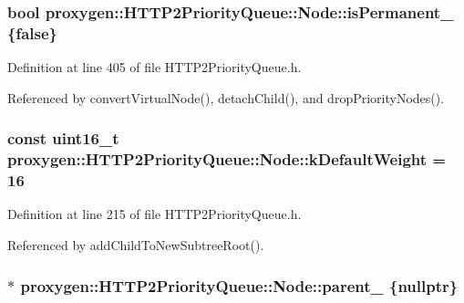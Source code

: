 \subsubsection[{is\+Permanent\+\_\+}]{\setlength{\rightskip}{0pt plus 5cm}bool proxygen\+::\+H\+T\+T\+P2\+Priority\+Queue\+::\+Node\+::is\+Permanent\+\_\+ \{false\}\hspace{0.3cm}{\ttfamily [private]}}\label{classproxygen_1_1HTTP2PriorityQueue_1_1Node_af20865216d96f0bc45abdd2171791fad}


Definition at line 405 of file H\+T\+T\+P2\+Priority\+Queue.\+h.



Referenced by convert\+Virtual\+Node(), detach\+Child(), and drop\+Priority\+Nodes().

\subsubsection[{k\+Default\+Weight}]{\setlength{\rightskip}{0pt plus 5cm}const uint16\+\_\+t proxygen\+::\+H\+T\+T\+P2\+Priority\+Queue\+::\+Node\+::k\+Default\+Weight = 16\hspace{0.3cm}{\ttfamily [static]}}\label{classproxygen_1_1HTTP2PriorityQueue_1_1Node_ae5295eff5c62ee4b2beed72ba4d3da77}


Definition at line 215 of file H\+T\+T\+P2\+Priority\+Queue.\+h.



Referenced by add\+Child\+To\+New\+Subtree\+Root().

\subsubsection[{parent\+\_\+}]{$\ast$ proxygen\+::\+H\+T\+T\+P2\+Priority\+Queue\+::\+Node\+::parent\+\_\+ \{{\bf nullptr}\}\hspace{0.3cm}{\ttfamily [private]}}\label{classproxygen_1_1HTTP2PriorityQueue_1_1Node_ac2ad7dd94ab501566da25cbdbee5d352}


